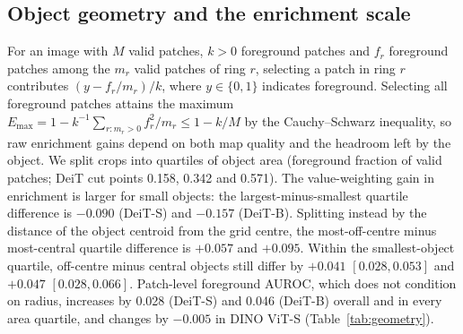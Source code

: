 \subsection{Object geometry and the enrichment scale}
For an image with $M$ valid patches, $k>0$ foreground patches and $f_r$ foreground patches among the $m_r$ valid patches of ring $r$, selecting a patch in ring $r$ contributes $(y-f_r/m_r)/k$, where $y\in\{0,1\}$ indicates foreground. Selecting all foreground patches attains the maximum $E_{\max}=1-k^{-1}\sum_{r:m_r>0}f_r^2/m_r\le 1-k/M$ by the Cauchy--Schwarz inequality, so raw enrichment gains depend on both map quality and the headroom left by the object. We split crops into quartiles of object area (foreground fraction of valid patches; DeiT cut points 0.158, 0.342 and 0.571). The value-weighting gain in enrichment is larger for small objects: the largest-minus-smallest quartile difference is $-0.090$ (DeiT-S) and $-0.157$ (DeiT-B). Splitting instead by the distance of the object centroid from the grid centre, the most-off-centre minus most-central quartile difference is $+0.057$ and $+0.095$. Within the smallest-object quartile, off-centre minus central objects still differ by $+0.041$ $[0.028, 0.053]$ and $+0.047$ $[0.028, 0.066]$. Patch-level foreground AUROC, which does not condition on radius, increases by 0.028 (DeiT-S) and 0.046 (DeiT-B) overall and in every area quartile, and changes by $-0.005$ in DINO ViT-S (Table~\ref{tab:geometry}).

\begin{table}[!htbp]\centering
\begin{minipage}[c]{0.56\linewidth}\centering\small\resizebox{\linewidth}{!}{}\end{minipage}\hfill
\begin{minipage}[c]{0.4\linewidth}
\caption{Value weighting minus received attention by quartile of object area on ImageNet-S (Q1: smallest objects). AUROC excludes crops consisting only of foreground.}
\label{tab:geometry}
\end{minipage}
\end{table}

